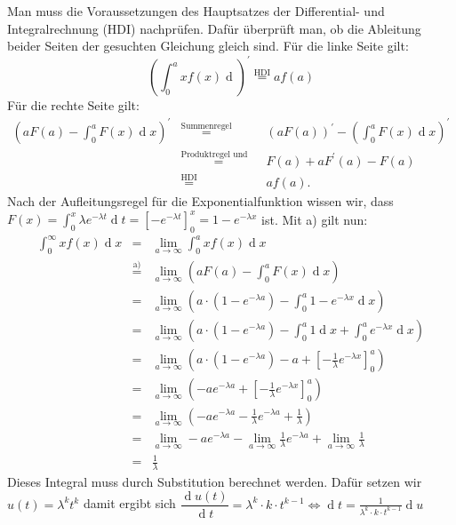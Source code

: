 \begin{Answer}
\Question Man muss die Voraussetzungen des Hauptsatzes der Differential- und Integralrechnung (HDI) nachprüfen. Dafür überprüft man, ob die Ableitung beider Seiten der gesuchten Gleichung gleich sind. Für die linke Seite gilt:
\begin{equation*}
	\left(\int_0^{a}xf(x)\operatorname{d}\right)^{'}\stackrel{\text{HDI}}{=} af(a) 
\end{equation*}
Für die rechte Seite gilt:
\begin{eqnarray*}
	\left(aF(a)-\int_0^{a}F(x)\operatorname{d}x\right)^{'}&\stackrel{\text{Summenregel}}{=}& \left(aF(a)\right)^{'}-\left(\int_{0}^{a}F(x)\operatorname{d}x\right)^{'} \\
	&\stackrel{\text{Produktregel und HDI}}{=}&F(a)+aF^{'}(a)-F(a)\\
	&\stackrel{\text{HDI}}{=}&af(a).
\end{eqnarray*}
\Question Nach der Aufleitungsregel für die Exponentialfunktion wissen wir, dass 
$F(x)=\int_0^{x}\lambda e^{-\lambda t}\operatorname{d}t=\left[-e^{-\lambda t}\right]_0^x=1-e^{-\lambda x}$ ist.
Mit a) gilt nun:
\begin{eqnarray*}
	\int_0^{\infty}xf(x)\operatorname{d}x&=&\lim_{a\to\infty}\int_0^{a}xf(x)\operatorname{d}x\\
	&\stackrel{\text{a)}}{=}&\lim_{a\to\infty}\left(aF(a)-\int_0^{a}F(x)\operatorname{d}x\right)\\
	&=&\lim_{a\to\infty}\left(a\cdot(1-e^{-\lambda a})-\int_0^{a}1-e^{-\lambda x}\operatorname{d}x\right)\\
	&=&\lim_{a\to\infty}\left(a\cdot(1-e^{-\lambda a})-\int_0^{a}1\operatorname{d}x+\int_0^{a}e^{-\lambda x}\operatorname{d}x\right)\\
	&=&\lim_{a\to\infty}\left(a\cdot(1-e^{-\lambda a})-a+\left[-\frac{1}{\lambda}e^{-\lambda x}\right]_0^a\right)\\
	&=&\lim_{a\to\infty}\left(-ae^{-\lambda a}+\left[-\frac{1}{\lambda}e^{-\lambda x}\right]_0^a\right)\\
	&=&\lim_{a\to\infty}\left(-ae^{-\lambda a}-\frac{1}{\lambda}e^{-\lambda a}+\frac{1}{\lambda}\right)\\
	&=&\lim_{a\to\infty}-ae^{-\lambda a}-\lim_{a\to\infty}\frac{1}{\lambda}e^{-\lambda a}+\lim_{a\to\infty}\frac{1}{\lambda}\\
	&=&\frac{1}{\lambda}
\end{eqnarray*}
\Question Dieses Integral muss durch Substitution berechnet werden. Dafür setzen wir $u(t)=\lambda^kt^k$ damit ergibt sich $\dfrac{\operatorname{d}u(t)}{\operatorname{d}t}=\lambda^k \cdot k\cdot t^{k-1}\Leftrightarrow \operatorname{d}t=\frac{1}{\lambda^k\cdot k\cdot t^{k-1}}\operatorname{d}u$

\end{Answer}
